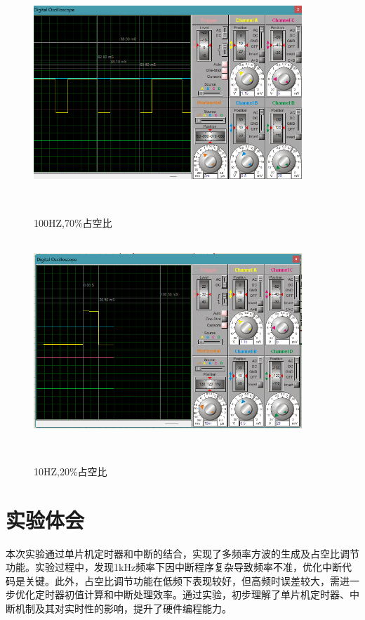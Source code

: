 \documentclass[12pt,hyperref,a4paper,UTF8]{ctexart}
\begin{document}
\begin{figure}[H] %
        \centering
        \includegraphics[width=0.9\textwidth]{figures/206.png} %
        \caption{100HZ,70\%占空比} %
        \label{fig:example} %
\end{figure}


\begin{figure}[H] %
        \centering
        \includegraphics[width=0.9\textwidth]{figures/207.png} %
        \caption{10HZ,20\%占空比} %
        \label{fig:example} %
\end{figure}

\section{实验体会}


本次实验通过单片机定时器和中断的结合，实现了多频率方波的生成及占空比调节功能。实验过程中，发现1kHz频率下因中断程序复杂导致频率不准，优化中断代码是关键。此外，占空比调节功能在低频下表现较好，但高频时误差较大，需进一步优化定时器初值计算和中断处理效率。通过实验，初步理解了单片机定时器、中断机制及其对实时性的影响，提升了硬件编程能力。
\end{document}
